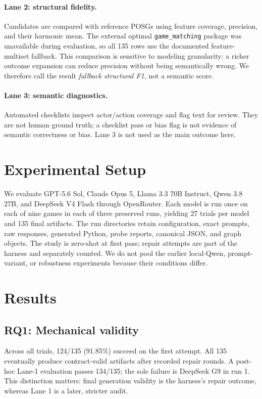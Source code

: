 \documentclass{article}
\begin{document}
\paragraph{Lane 2: structural fidelity.}
Candidates are compared with reference POSGs using feature coverage, precision,
and their harmonic mean. The external optimal \texttt{game\_matching} package
was unavailable during evaluation, so all 135 rows use the documented
feature-multiset fallback. This comparison is sensitive to modeling granularity:
a richer outcome expansion can reduce precision without being semantically
wrong. We therefore call the result \emph{fallback structural F1}, not a
semantic score.

\paragraph{Lane 3: semantic diagnostics.}
Automated checklists inspect actor/action coverage and flag text for review.
They are not human ground truth; a checklist pass or bias flag is not evidence
of semantic correctness or bias. Lane 3 is not used as the main outcome here.

\section{Experimental Setup}
We evaluate GPT-5.6 Sol, Claude Opus 5, Llama 3.3 70B Instruct, Qwen 3.8 27B,
and DeepSeek V4 Flash through OpenRouter. Each model is run once on each of nine
games in each of three preserved runs, yielding 27 trials per model and 135
final artifacts. The run directories retain configuration, exact prompts, raw
responses, generated Python, probe reports, canonical JSON, and graph objects.
The study is zero-shot at first pass; repair attempts are part of the harness
and separately counted. We do not pool the earlier local-Qwen, prompt-variant,
or robustness experiments because their conditions differ.

\section{Results}
\subsection{RQ1: Mechanical validity}
Across all trials, 124/135 (91.85\%) succeed on the first attempt. All 135
eventually produce contract-valid artifacts after recorded repair rounds. A
post-hoc Lane-1 evaluation passes 134/135; the sole failure is DeepSeek G9 in
run 1. This distinction matters: final generation validity is the harness's
repair outcome, whereas Lane 1 is a later, stricter audit.
\end{document}
